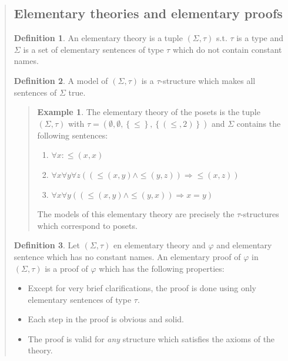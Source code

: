 \documentclass[a4paper, 12pt]{article}
\theoremstyle{definition}
\theoremstyle{definition}
\newtheorem{example}{Example}
\theoremstyle{definition}
\newtheorem{definition}{Definition}
\begin{document}
\begin{quote}
\subsection{Elementary theories and elementary proofs}

\begin{definition}
    An elementary theory is a tuple $(\Sigma, \tau)$ s.t. $\tau$ is a type and $\Sigma$
    is a set of elementary sentences of type $\tau$ which do not 
    contain constant names.
\end{definition}

\begin{definition}
    A model of $(\Sigma, \tau)$ is a $\tau$-structure which makes all 
    sentences of $\Sigma$ true.
\end{definition}


\small
\begin{quote}

\begin{example}
    The elementary theory of the posets is the tuple $(\Sigma, \tau)$ with 
    $\tau = (\emptyset, \emptyset, \left\{ \leq \right\}, \left\{ (\leq, 2) \right\} )$ 
    and $\Sigma$ contains the following sentences: 

    \begin{enumerate}
        \item $\forall x : \leq(x, x)$
        \item $\forall x \forall y \forall z \left( (\leq(x, y) \land  \leq(y, z) ) \Rightarrow\leq(x, z) \right) $
        \item $\forall x \forall y \left( (\leq(x, y) \land  \leq(y, x)) \Rightarrow x = y \right) $
    \end{enumerate}

    The models of this elementary theory are precisely the $\tau$-structures 
    which correspond to posets.

\end{example}

\end{quote}
\normalsize

\begin{definition}
    Let $(\Sigma, \tau)$ en elementary theory and $\varphi$ and elementary 
    sentence which has no constant names. An elementary 
    proof of $\varphi$ in $(\Sigma, \tau)$ is a proof of $\varphi$
    which has the following properties: 

    \begin{itemize}
        \item Except for very brief clarifications, the proof is done using 
            only elementary sentences of type $\tau$.
        \item Each step in the proof is obvious and solid. 
        \item The proof is valid for \textit{any} structure which satisfies 
            the axioms of the theory.
    \end{itemize}
\end{definition}


\end{quote}
\end{document}
